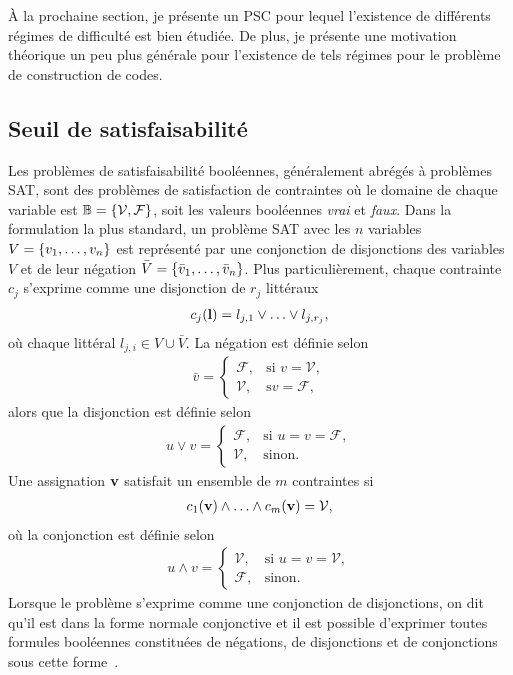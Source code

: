 À la prochaine section, 
je présente un PSC pour lequel l'existence de différents régimes de difficulté 
est bien étudiée. 
De plus, je présente une motivation théorique un peu plus générale pour l'existence de
tels régimes pour le problème de construction de codes.

\subsection{Seuil de satisfaisabilité}

Les problèmes de satisfaisabilité booléennes,
généralement abrégés à problèmes SAT,
sont des problèmes de satisfaction de contraintes où le domaine de chaque variable
est $\mathbb B = \qty{\mathcal V, \mathcal F}$,
soit les valeurs booléennes \textit{vrai} et \textit{faux}.
Dans la formulation la plus standard,
un problème SAT avec les $n$ variables $V = \qty{v_1,\ldots, v_n}$
est représenté par une conjonction de disjonctions des variables $V$ et de leur négation 
$\bar V = \qty{\bar v_1, \ldots, \bar v_n}$.
Plus particulièrement,
chaque contrainte $c_j$ s'exprime comme une disjonction de $r_j$ littéraux
\begin{align}
  c_j(\vb l) = l_{j, 1} \lor \ldots \lor l_{j, r_{j}},
\end{align}
où chaque littéral $l_{j, i} \in V \cup \bar V$.
La négation est définie selon
\begin{align}
  \bar v = 
  \begin{cases}
    \mathcal F, &\text{si } v = \mathcal V, \\
    \mathcal V, &\text{s} v = \mathcal F,
  \end{cases}
\end{align}
alors que la disjonction est définie selon
\begin{align}
  u \lor v = 
  \begin{cases}
    \mathcal F, &\text{si } u = v = \mathcal F, \\
    \mathcal V, &\text{sinon}.
  \end{cases}
\end{align}
Une assignation $\vb v$ satisfait un ensemble de $m$ contraintes si
\begin{align}
  c_1(\vb v) \land \ldots \land c_m(\vb v) = \mathcal V,
\end{align}
où la conjonction est définie selon
\begin{align}
  u \land v = 
  \begin{cases}
    \mathcal V, &\text{si } u = v = \mathcal V, \\
    \mathcal F, &\text{sinon}.
  \end{cases}
\end{align}
Lorsque le problème s'exprime comme une conjonction de disjonctions,
on dit qu'il est dans la forme normale conjonctive
et il est possible d'exprimer toutes formules booléennes constituées de négations,
de disjonctions et de conjonctions sous cette forme~\cite{tseitin_complexity_1983}.

